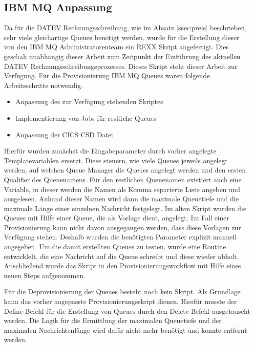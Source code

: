 \subsection{IBM MQ Anpassung}\label{ssec:mqentw}
Da für die DATEV Rechnungsschreibung, wie im Absatz \ref{ssec:preis} beschrieben, sehr viele gleichartige Queues benötigt werden, wurde für die Erstellung dieser von den IBM MQ Administratorenteam ein REXX Skript angefertigt.
Dies geschah unabhängig dieser Arbeit zum Zeitpunkt der Einführung des aktuellen DATEV Rechnungsschreibungsprozesses.
Dieses Skript steht dieser Arbeit zur Verfügung.
Für die Provisionierung IBM MQ Queues waren folgende Arbeitsschritte notwendig.

\begin{samepage}
\begin{itemize}
\item Anpassung des zur Verfügung stehenden Skriptes
\item Implementierung von Jobs für restliche Queues
\item Anpassung der CICS CSD Datei
\end{itemize}
\end{samepage}

Hierfür wurden zunächst die Eingabeparameter durch vorher angelegte Templatevariablen ersetzt.
Diese steuern, wie viele Queues jeweils angelegt werden, auf welchen Queue Manager die Queues angelegt werden und den ersten Qualifier des Queuenamens.
Für den restlichen Queuenamen existiert auch eine Variable, in dieser werden die Namen als Komma separierte Liste angeben und ausgelesen.
Anhand dieser Namen wird dann die maximale Queuetiefe und die maximale Länge einer einzelnen Nachricht festgelegt.
Im alten Skript wurden die Queues mit Hilfe einer Queue, die als Vorlage dient, angelegt.
Im Fall einer Provisionierung kann nicht davon ausgegangen werden, dass diese Vorlagen zur Verfügung stehen.
Deshalb wurden die benötigten Parameter explizit manuell angegeben.
Um die damit erstellten Queues zu testen, wurde eine Routine entwicklelt, die eine Nachricht auf die Queue schreibt und diese wieder abholt.
Anschließend wurde das Skript in den Provisionierungsworkflow mit Hilfe eines neuen Steps aufgenommen.

Für die Deprovisionierung der Queues besteht noch kein Skript.
Als Grundlage kann das vorher angepasste Provisionierungsskript dienen.
Hierfür musste der \glqq Define\grqq-Befehl für die Erstellung von Queues durch den \glqq Delete\grqq-Befehl ausgetauscht werden.
Die Logik für die Ermittlung der maximalen Queuetiefe und der maximalen Nachrichtenlänge wird dafür nicht mehr benötigt und konnte entfernt werden.

